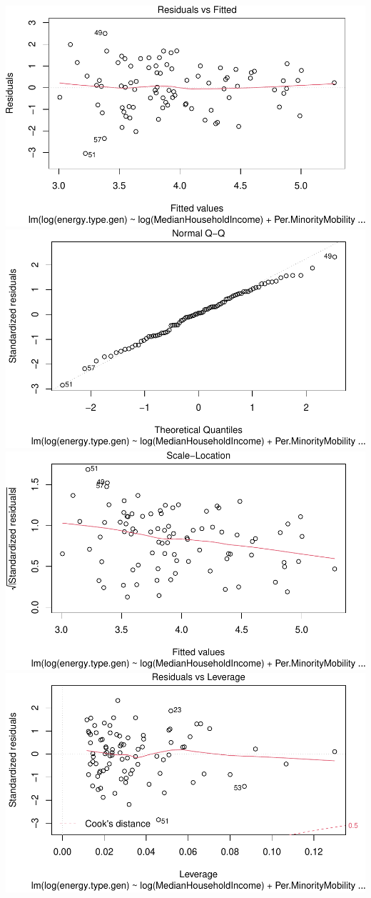 \documentclass[
  12pt,
]{article}
\begin{document}
\includegraphics{Project_files/figure-latex/unnamed-chunk-5-1.pdf}
\includegraphics{Project_files/figure-latex/unnamed-chunk-5-2.pdf}
\includegraphics{Project_files/figure-latex/unnamed-chunk-5-3.pdf}
\includegraphics{Project_files/figure-latex/unnamed-chunk-5-4.pdf}
\end{document}
